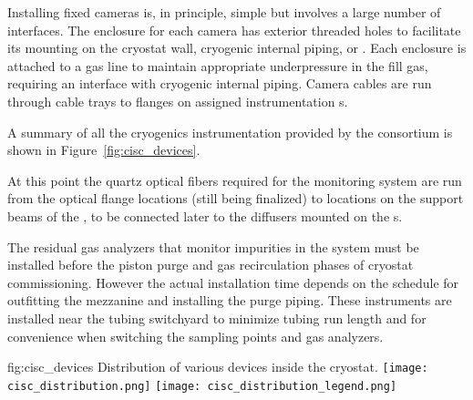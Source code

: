  
Installing fixed cameras is, in principle, simple but involves a large number of interfaces. The enclosure for each camera has exterior threaded holes to facilitate its mounting %
on the cryostat wall, cryogenic internal piping, or . Each enclosure is attached to a gas line to maintain appropriate underpressure in the fill gas, requiring an interface with cryogenic internal piping. Camera cables are run through cable trays to flanges on assigned instrumentation \fdth{}s. 


A summary of all the cryogenics instrumentation provided by the  consortium is shown in Figure~\ref{fig:cisc_devices}. 

At this point the quartz optical fibers required for the  monitoring system are run from the optical flange locations (still being finalized) to locations on the  support beams of the , to be connected later to the diffusers mounted on the s.


The residual gas analyzers that monitor impurities in the  system must be installed before the piston purge and gas recirculation phases of cryostat commissioning.  However the actual installation time depends on the schedule for outfitting the mezzanine and installing the   purge piping. These  instruments are installed near the tubing switchyard to minimize tubing run length and for convenience when switching the sampling points and gas analyzers. 

\begin{dunefigure}{fig:cisc_devices}
  {Distribution of various  devices inside the cryostat.
  }
  \texttt{[image: cisc\_distribution.png]}
  \texttt{[image: cisc\_distribution\_legend.png]}
\end{dunefigure}

\clearpage



